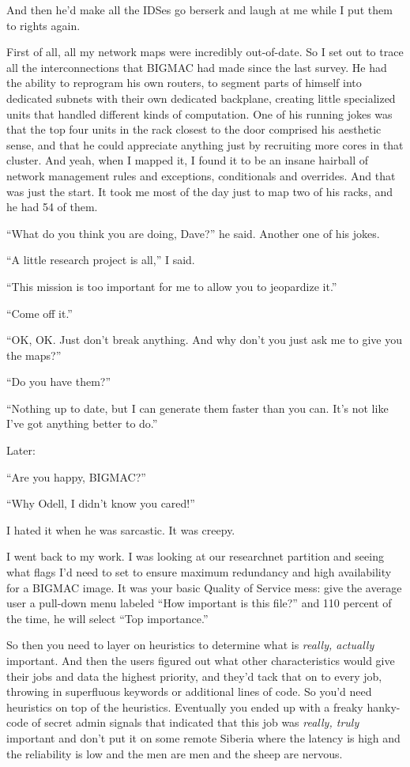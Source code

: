 And then he'd make all the IDSes go berserk and laugh at me while I put 
them to rights again.

First of all, all my network maps were incredibly out-of-date. So I set 
out to trace all the interconnections that BIGMAC had made since the 
last survey. He had the ability to reprogram his own routers, to 
segment parts of himself into dedicated subnets with their own 
dedicated backplane, creating little specialized units that handled 
different kinds of computation. One of his running jokes was that the 
top four units in the rack closest to the door comprised his aesthetic 
sense, and that he could appreciate anything just by recruiting more 
cores in that cluster. And yeah, when I mapped it, I found it to be an 
insane hairball of network management rules and exceptions, 
conditionals and overrides. And that was just the start. It took me 
most of the day just to map two of his racks, and he had 54 of them.

“What do you think you are doing, Dave?” he said. Another one of 
his jokes.

“A little research project is all,” I said.

“This mission is too important for me to allow you to jeopardize 
it.”

“Come off it.”

“OK, OK. Just don't break anything. And why don't you just ask me to 
give you the maps?”

“Do you have them?”

“Nothing up to date, but I can generate them faster than you can. 
It's not like I've got anything better to do.”

\tb

Later:

“Are you happy, BIGMAC?”

“Why Odell, I didn't know you cared!”

I hated it when he was sarcastic. It was creepy.

I went back to my work. I was looking at our researchnet partition and 
seeing what flags I'd need to set to ensure maximum redundancy and high 
availability for a BIGMAC image. It was your basic Quality of Service 
mess: give the average user a pull-down menu labeled “How important 
is this file?” and 110 percent of the time, he will select “Top 
importance.”

So then you need to layer on heuristics to determine what is 
\emph{really, actually} important. And then the users figured out what 
other characteristics would give their jobs and data the highest 
priority, and they'd tack that on to every job, throwing in superfluous 
keywords or additional lines of code. So you'd need heuristics on top 
of the heuristics. Eventually you ended up with a freaky hanky-code of 
secret admin signals that indicated that this job was \emph{really, 
truly} important and don't put it on some remote Siberia where the 
latency is high and the reliability is low and the men are men and the 
sheep are nervous.

